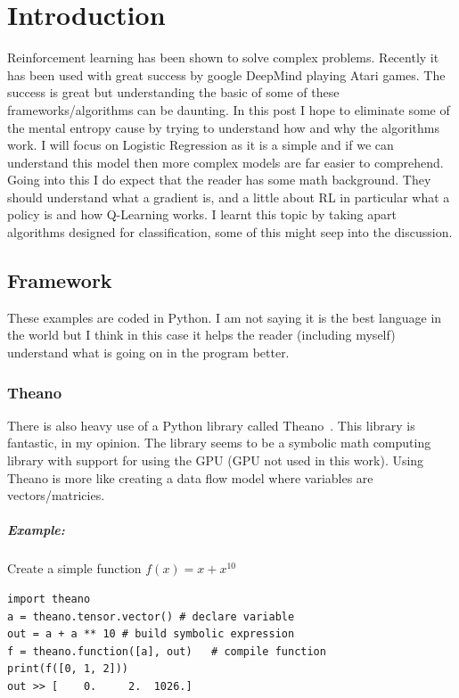 \chapter{Introduction}
\label{chapter:introduction}

Reinforcement learning has been shown to solve complex problems. Recently it has been used with great success by google DeepMind playing Atari games. The success is great but understanding the basic of some of these frameworks/algorithms can be daunting. In this post I hope to eliminate some of the mental entropy cause by trying to understand how and why the algorithms work. I will focus on Logistic Regression as it is a simple and if we can understand this model then more complex models are far easier to comprehend. 
Going into this I do expect that the reader has some math background. They should understand what a gradient is, and a little about RL in particular what a policy is and how Q-Learning works. I learnt this topic by taking apart algorithms designed for classification, some of this might seep into the discussion.

\section{Framework}

These examples are coded in Python. I am not saying it is the best language in the world but I think in this case it helps the reader (including myself) understand what is going on in the program better.

\subsection{Theano}

There is also heavy use of a Python library called Theano~\cite{Bastien-Theano-2012}. This library is fantastic, in my opinion. The library seems to be a symbolic math computing library with support for using the GPU (GPU not used in this work). Using Theano is more like creating a data flow model where variables are vectors/matricies.

\paragraph{Example:} Create a simple function $f(x)=x+x^{10}$

\begin{lstlisting}
import theano
a = theano.tensor.vector() # declare variable
out = a + a ** 10 # build symbolic expression
f = theano.function([a], out)   # compile function
print(f([0, 1, 2]))
out >> [    0.     2.  1026.]
\end{lstlisting}
 

